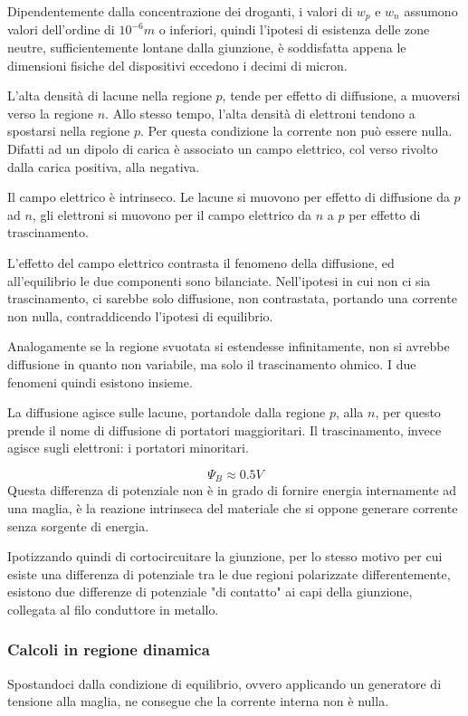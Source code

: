 \documentclass[../template]{subfiles}
\begin{document}
Dipendentemente dalla concentrazione dei droganti, i valori di $w_p$ e $w_n$ assumono valori dell'ordine di $10^{-6} m$ o inferiori, quindi l'ipotesi di esistenza delle zone neutre, sufficientemente lontane dalla giunzione, è soddisfatta appena le dimensioni fisiche del dispositivi eccedono i decimi di micron.

L'alta densità di lacune nella regione $p$, tende per effetto di diffusione, a muoversi verso la regione $n$.
Allo stesso tempo, l'alta densità di elettroni tendono a spostarsi nella regione $p$. Per questa condizione la corrente non può essere nulla. Difatti ad un dipolo di carica è associato un campo elettrico, col verso rivolto dalla carica positiva, alla negativa.

Il campo elettrico è intrinseco. Le lacune si muovono per effetto di diffusione da $p$ ad $n$, gli elettroni si muovono per il campo elettrico da $n$ a $p$ per effetto di trascinamento.

L'effetto del campo elettrico contrasta il fenomeno della diffusione, ed all'equilibrio le due componenti sono bilanciate.
Nell'ipotesi in cui non ci sia trascinamento, ci sarebbe solo diffusione, non contrastata, portando una corrente non nulla, contraddicendo l'ipotesi di equilibrio.

Analogamente se la regione svuotata si estendesse infinitamente, non si avrebbe diffusione in quanto non variabile, ma solo il trascinamento ohmico. I due fenomeni quindi esistono insieme.

La diffusione agisce sulle lacune, portandole dalla regione $p$, alla $n$, per questo prende il nome di diffusione di portatori maggioritari. Il trascinamento, invece agisce sugli elettroni: i portatori minoritari.

\[
    \Psi_B \approx 0.5 V
\]
Questa differenza di potenziale non è in grado di fornire energia internamente ad una maglia, è la reazione intrinseca del materiale che si oppone generare corrente senza sorgente di energia.

Ipotizzando quindi di cortocircuitare la giunzione, per lo stesso motivo per cui esiste una differenza di potenziale tra le due regioni polarizzate differentemente, esistono due differenze di potenziale "di contatto" ai capi della giunzione, collegata al filo conduttore in metallo.

\subsubsection{Calcoli in regione dinamica}
Spostandoci dalla condizione di equilibrio, ovvero applicando un generatore di tensione alla maglia, ne consegue che la corrente interna non è nulla.
\end{document}
